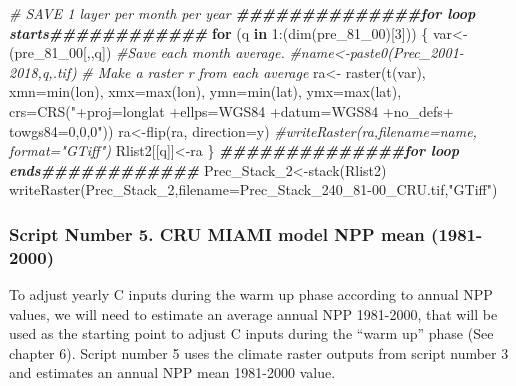 \documentclass[
  10pt,
  b5paper,
]{book}
\newenvironment{Shaded}{\begin{snugshade}}{\end{snugshade}}
\newcommand{\AttributeTok}[1]{\textcolor[rgb]{0.77,0.63,0.00}{#1}}
\newcommand{\CommentTok}[1]{\textcolor[rgb]{0.56,0.35,0.01}{\textit{#1}}}
\newcommand{\ControlFlowTok}[1]{\textcolor[rgb]{0.13,0.29,0.53}{\textbf{#1}}}
\newcommand{\DecValTok}[1]{\textcolor[rgb]{0.00,0.00,0.81}{#1}}
\newcommand{\DocumentationTok}[1]{\textcolor[rgb]{0.56,0.35,0.01}{\textbf{\textit{#1}}}}
\newcommand{\FunctionTok}[1]{\textcolor[rgb]{0.00,0.00,0.00}{#1}}
\newcommand{\NormalTok}[1]{#1}
\newcommand{\OtherTok}[1]{\textcolor[rgb]{0.56,0.35,0.01}{#1}}
\newcommand{\SpecialCharTok}[1]{\textcolor[rgb]{0.00,0.00,0.00}{#1}}
\newcommand{\StringTok}[1]{\textcolor[rgb]{0.31,0.60,0.02}{#1}}
\begin{document}
\begin{Shaded}
\begin{Highlighting}[]
 \CommentTok{\# SAVE 1 layer per month per year}
\DocumentationTok{\#\#\#\#\#\#\#\#\#\#\#\#\#\#for loop starts\#\#\#\#\#\#\#\#\#\#\#\#}
 \ControlFlowTok{for}\NormalTok{ (q }\ControlFlowTok{in} \DecValTok{1}\SpecialCharTok{:}\NormalTok{(}\FunctionTok{dim}\NormalTok{(pre\_81\_00)[}\DecValTok{3}\NormalTok{])) \{}
\NormalTok{var}\OtherTok{\textless{}{-}}\NormalTok{(pre\_81\_00[,,q])}
 \CommentTok{\#Save each month average. }
 \CommentTok{\#name\textless{}{-}paste0(\textquotesingle{}Prec\_2001{-}2018\textquotesingle{},q,\textquotesingle{}.tif\textquotesingle{})}
 \CommentTok{\# Make a raster r from each average}
\NormalTok{ra}\OtherTok{\textless{}{-}} \FunctionTok{raster}\NormalTok{(}\FunctionTok{t}\NormalTok{(var), }\AttributeTok{xmn=}\FunctionTok{min}\NormalTok{(lon), }\AttributeTok{xmx=}\FunctionTok{max}\NormalTok{(lon), }\AttributeTok{ymn=}\FunctionTok{min}\NormalTok{(lat), }\AttributeTok{ymx=}\FunctionTok{max}\NormalTok{(lat), }\AttributeTok{crs=}\FunctionTok{CRS}\NormalTok{(}\StringTok{"+proj=longlat +ellps=WGS84 +datum=WGS84 +no\_defs+ towgs84=0,0,0"}\NormalTok{))}
\NormalTok{ra}\OtherTok{\textless{}{-}}\FunctionTok{flip}\NormalTok{(ra, }\AttributeTok{direction=}\StringTok{\textquotesingle{}y\textquotesingle{}}\NormalTok{)}
\CommentTok{\#writeRaster(ra,filename=name, format="GTiff")}
\NormalTok{Rlist2[[q]]}\OtherTok{\textless{}{-}}\NormalTok{ra}
\NormalTok{\}}
\DocumentationTok{\#\#\#\#\#\#\#\#\#\#\#\#\#\#for loop ends\#\#\#\#\#\#\#\#\#\#\#\#}
\NormalTok{Prec\_Stack\_2}\OtherTok{\textless{}{-}}\FunctionTok{stack}\NormalTok{(Rlist2)}
\FunctionTok{writeRaster}\NormalTok{(Prec\_Stack\_2,}\AttributeTok{filename=}\StringTok{\textquotesingle{}Prec\_Stack\_240\_81{-}00\_CRU.tif\textquotesingle{}}\NormalTok{,}\StringTok{"GTiff"}\NormalTok{)}
\end{Highlighting}
\end{Shaded}

\hypertarget{script-number-5.-cru-miami-model-npp-mean-1981-2000}{%
\subsubsection{Script Number 5. CRU MIAMI model NPP mean (1981-2000)}\label{script-number-5.-cru-miami-model-npp-mean-1981-2000}}

To adjust yearly C inputs during the warm up phase according to annual NPP values, we will need to estimate an average annual NPP 1981-2000, that will be used as the starting point to adjust C inputs during the ``warm up'' phase (See chapter 6). Script number 5 uses the climate raster outputs from script number 3 and estimates an annual NPP mean 1981-2000 value.
\end{document}

